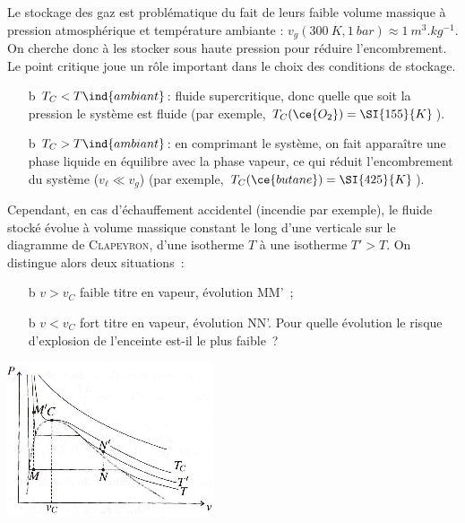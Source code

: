 \documentclass[../../main/main.tex]{subfiles}
\begin{document}
Le stockage des gaz est problématique du fait de leurs faible volume massique à
pression atmosphérique et température ambiante : $v_g(\SI{300}{K}, \SI{1}{bar})
	\approx \SI{1}{m^3.kg^{-1}}$. On cherche donc à les stocker sous haute pression
pour réduire l’encombrement. Le point critique joue un rôle important dans le
choix des conditions de stockage.
\begin{itemize}
	\item[b]{$T_C < T\ind{ambiant}$}: fluide supercritique, donc quelle que soit
	la pression le système est fluide (par exemple, $T_C(\ce{O_2}) =
		\SI{155}{K}$).

	\item[b]{$T_C > T\ind{ambiant}$}: en comprimant le système, on fait apparaître
	une phase liquide en équilibre avec la phase vapeur, ce qui réduit
	l'encombrement du système ($v_{\ell} \ll v_g$) (par exemple, $T_C
		(\ce{butane}) = \SI{425}{K}$).
\end{itemize}

Cependant, en cas d'échauffement accidentel (incendie par exemple), le fluide
stocké évolue à volume massique constant le long d'une verticale sur le
diagramme de \textsc{Clapeyron}, d'une isotherme $T$ à une isotherme $T'>T$. On
distingue alors deux situations~:
\smallbreak
\begin{isd}[righthand ratio=.3]
	\begin{itemize}
		\item[b]{$v > v_C$} faible titre en vapeur, évolution MM'~;
		\item[b]{$v < v_C$} fort titre en vapeur, évolution NN'.
		\olditem[?] Pour quelle évolution le risque d'explosion de l'enceinte est-il le plus
		faible~?
		\olditem[$\Ra$]
	\end{itemize}
	\tcblower
	\begin{center}
		\includegraphics[width=\linewidth]{stock_eau}
	\end{center}
\end{isd}
\end{document}
